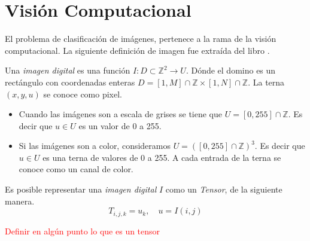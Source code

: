     \section{Visión Computacional}
    El problema de clasificación de imágenes, pertenece a la rama de la visión computacional. La siguiente definición de imagen fue extraída del libro \cite{computer_vision}.
    \begin{definition}
        Una \textsl{imagen digital} es una función $I:  D \subset \mathbb Z^2 \to U$. Dónde el domino es un rectángulo con coordenadas enteras $D = [1,M]\cap \mathbb Z \times [1,N] \cap \mathbb Z$. La terna $(x,y,u)$ se conoce como pixel.
        \begin{itemize}
            \item Cuando las imágenes son a escala de grises se tiene que $U=[0,255]\cap \mathbb Z$. Es decir que $u\in U$ es un valor de 0 a 255.
            \item Si las imágenes son a color, consideramos $U=([0,255]\cap \mathbb Z)^3$. Es decir que $u\in U$ es una terna de valores de 0 a 255. A cada entrada de la terna se conoce como un canal de color.
        \end{itemize}
    \end{definition}
    Es posible representar una \textsl{imagen digital} $I$ como un \textsl{Tensor}, de la siguiente manera.
    \begin{equation}
        T_{i,j,k} = u_k, \quad u = I(i,j)
    \end{equation}

    \textcolor{red}{Definir en algún punto lo que es un tensor}
